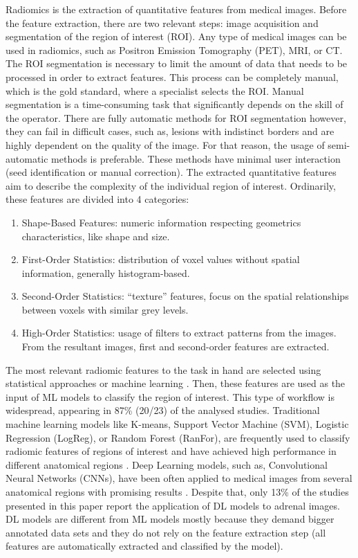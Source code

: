 \documentclass{article}
\begin{document}
Radiomics is the extraction of quantitative features from medical images. Before the feature extraction, there are two relevant
steps: image acquisition and segmentation of the region of interest (ROI). Any type of medical images can be used in radiomics,
such as Positron Emission Tomography (PET), MRI, or CT. The ROI segmentation is necessary to limit the amount of data that needs
to be processed in order to extract features. This process can be completely manual, which is the gold standard, where a specialist
selects the ROI. Manual segmentation is a time-consuming task that significantly depends on the skill of the operator. There are
fully automatic methods for ROI segmentation however, they can fail in difficult cases, such as, lesions with indistinct borders
and are highly dependent on the quality of the image. For that reason, the usage of semi-automatic methods is preferable.
These methods have minimal user interaction (seed identification or manual correction). The extracted quantitative features aim
to describe the complexity of the individual region of interest. Ordinarily, these features are divided into 4 categories:
\begin{enumerate}
    \item Shape-Based Features: numeric information respecting geometrics characteristics, like shape and size.
    \item First-Order Statistics: distribution of voxel values without spatial information, generally histogram-based.
    \item Second-Order Statistics: “texture” features, focus on the spatial relationships between voxels with similar grey levels.
    \item High-Order Statistics: usage of filters to extract patterns from the images. From the resultant images, first and second-order features are extracted.
\end{enumerate}

The most relevant radiomic features to the task in hand are selected using statistical approaches or machine learning \cite{Zhang2022}. Then, these features are used as the input of ML models to classify the region of interest. This type of workflow is widespread, appearing in 87\% (20/23) of the analysed studies.
Traditional machine learning models like K-means, Support Vector Machine (SVM), Logistic Regression (LogReg), or Random Forest (RanFor), are frequently used to classify radiomic features of regions of interest and have achieved high performance in different anatomical regions \cite{Zhang2022, Wagner2021}. Deep Learning models, such as, Convolutional Neural Networks (CNNs), have been often applied to medical images from several anatomical regions with promising results \cite{Anaya-Isaza2021}. Despite that, only 13\% of the studies presented in this paper report the application of DL models to adrenal images. DL models are different from ML models mostly because they demand bigger annotated data sets and they do not rely on the feature extraction step (all features are automatically extracted and classified by the model).
\end{document}
